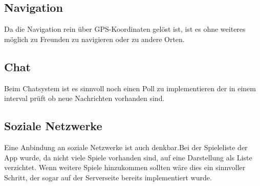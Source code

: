 \subsection{Navigation}
Da die Navigation rein über GPS-Koordinaten gelöst ist, ist es ohne weiteres möglich zu Freunden zu navigieren oder zu andere Orten.

\subsection{Chat}
Beim Chatsystem ist es sinnvoll noch einen Poll zu implementieren der in einem interval prüft ob neue Nachrichten vorhanden sind.

\subsection{Soziale Netzwerke}
Eine Anbindung an soziale Netzwerke ist auch denkbar.Bei der Spieleliste der App wurde, da nicht viele Spiele vorhanden sind, auf eine Darstellung als Liste verzichtet. Wenn weitere Spiele hinzukommen sollten wäre dies ein sinnvoller Schritt, der sogar auf der Serverseite bereits implementiert wurde.\\
